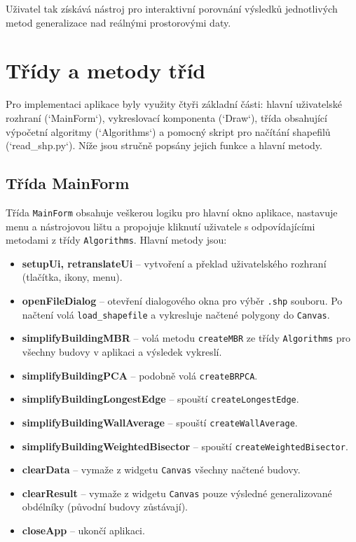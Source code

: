 \documentclass[a4paper,12pt]{article}
\begin{document}
Uživatel tak získává nástroj pro interaktivní porovnání výsledků jednotlivých metod generalizace nad reálnými prostorovými daty.

\section{Třídy a metody tříd}

Pro implementaci aplikace byly využity čtyři základní části: hlavní uživatelské rozhraní (`MainForm`), vykreslovací komponenta (`Draw`), třída obsahující výpočetní algoritmy (`Algorithms`) a pomocný skript pro načítání shapefilů (`read\_shp.py`). Níže jsou stručně popsány jejich funkce a hlavní metody.

\subsection{Třída MainForm}
Třída \texttt{MainForm} obsahuje veškerou logiku pro hlavní okno aplikace, nastavuje menu a nástrojovou lištu a propojuje kliknutí uživatele s odpovídajícími metodami z třídy \texttt{Algorithms}. Hlavní metody jsou:

\begin{itemize}
    \item \textbf{setupUi, retranslateUi} – vytvoření a překlad uživatelského rozhraní (tlačítka, ikony, menu).
    \item \textbf{openFileDialog} – otevření dialogového okna pro výběr \texttt{.shp} souboru. Po načtení volá \texttt{load\_shapefile} a vykresluje načtené polygony do \texttt{Canvas}.
    \item \textbf{simplifyBuildingMBR} – volá metodu \texttt{createMBR} ze třídy \texttt{Algorithms} pro všechny budovy v aplikaci a výsledek vykreslí.
    \item \textbf{simplifyBuildingPCA} – podobně volá \texttt{createBRPCA}.
    \item \textbf{simplifyBuildingLongestEdge} – spouští \texttt{createLongestEdge}.
    \item \textbf{simplifyBuildingWallAverage} – spouští \texttt{createWallAverage}.
    \item \textbf{simplifyBuildingWeightedBisector} – spouští \texttt{createWeightedBisector}.
    \item \textbf{clearData} – vymaže z widgetu \texttt{Canvas} všechny načtené budovy.
    \item \textbf{clearResult} – vymaže z widgetu \texttt{Canvas} pouze výsledné generalizované obdélníky (původní budovy zůstávají).
    \item \textbf{closeApp} – ukončí aplikaci.
\end{itemize}
\end{document}
